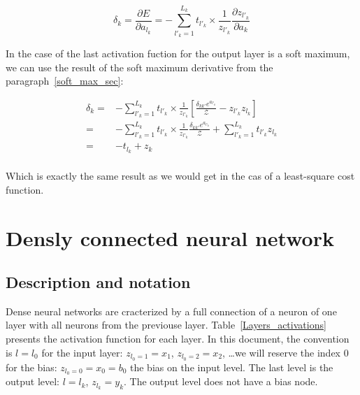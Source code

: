 \documentclass[final, paper=letter,5p,times,twocolumn]{elsarticle}
\begin{document}
\begin{equation}
  \delta_{k} = \frac{\partial E}{\partial a_{l_{k}}} = - \sum_{l'_{k} = 1}^{L_{k}} t_{l'_{k}} \times \frac{1}{z_{l'_{k}}} \frac{\partial z_{l'_{k}}}{\partial a_{k}}
  \label{cost_function_error}
\end{equation}

In the case of the last activation fuction for the output layer is a soft maximum, we can use the result of the soft maximum derivative from the paragraph~\ref{soft_max_sec}:

\begin{equation*}
  \begin{split}
    \delta_{k} = & - \sum_{l'_{k} = 1}^{L_{k}} t_{l'_{k}} \times \frac{1}{z_{l'_{k}}} \left \lbrack  \frac{\delta_{kk'} e^{a_{l'_{k}}}}{\mathcal{Z}} - z_{l'_{k}}z_{l_{k}} \right \rbrack \\
    = & - \sum_{l'_{k} = 1}^{L_{k}} t_{l'_{k}} \times \frac{1}{z_{l'_{k}}} \frac{\delta_{kk'} e^{a_{l'_{k}}}}{\mathcal{Z}} +  \sum_{l'_{k} = 1}^{L_{k}} t_{l'_{k}} z_{l_{k}} \\
    = & - t_{l_{k}} +  z_{k} \\
  \end{split}
\end{equation*}



Which is exactly the same result as we would get in the cas of a least-square cost function.


\section{Densly connected neural network}
\subsection{Description and notation}

Dense neural networks are cracterized by a full connection of a neuron of one layer with all neurons from the previouse layer. Table~\ref{Layers_activations} presents the activation function for each layer. In this document, the convention is $l = l_{0}$ for the input layer: $z_{l_{0} = 1} = x_{1}$, $z_{l_{0} = 2} = x_{2}$, \dots we will reserve the index 0 for the bias: $z_{l_{0} = 0} = x_{0} = b_{0}$ the bias on the input level. The last level is the output level: $l = l_{k}$, $z_{l_{k}} = y_{k}$. The output level does not have a bias node.
\end{document}
